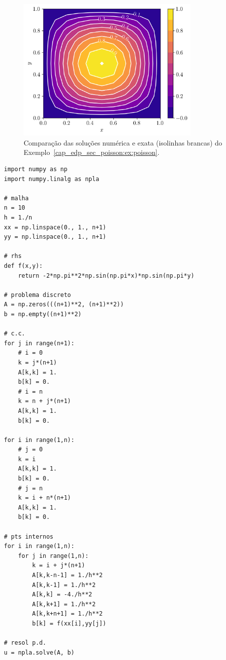 \begin{ex}
\begin{figure}[H]
  \centering
  \includegraphics[width=0.8\textwidth]{./cap_edp/dados/fig_ex_poisson/fig_contour}
  \caption{Comparação das soluções numérica e exata (isolinhas brancas) do Exemplo~\ref{cap_edp_sec_poisson:ex:poisson}.}
  \label{cap_edp_sec_poisson:fig:ex_poisson_b}
\end{figure}

\begin{lstlisting}[caption=mdf\_poisson.py]
import numpy as np
import numpy.linalg as npla

# malha
n = 10
h = 1./n
xx = np.linspace(0., 1., n+1)
yy = np.linspace(0., 1., n+1)

# rhs
def f(x,y):
    return -2*np.pi**2*np.sin(np.pi*x)*np.sin(np.pi*y)

# problema discreto
A = np.zeros(((n+1)**2, (n+1)**2))
b = np.empty((n+1)**2)

# c.c.
for j in range(n+1):
    # i = 0
    k = j*(n+1)
    A[k,k] = 1.
    b[k] = 0.
    # i = n
    k = n + j*(n+1)
    A[k,k] = 1.
    b[k] = 0.

for i in range(1,n):
    # j = 0
    k = i
    A[k,k] = 1.
    b[k] = 0.
    # j = n
    k = i + n*(n+1)
    A[k,k] = 1.
    b[k] = 0.

# pts internos
for i in range(1,n):
    for j in range(1,n):
        k = i + j*(n+1)
        A[k,k-n-1] = 1./h**2
        A[k,k-1] = 1./h**2
        A[k,k] = -4./h**2
        A[k,k+1] = 1./h**2
        A[k,k+n+1] = 1./h**2
        b[k] = f(xx[i],yy[j])

# resol p.d.
u = npla.solve(A, b)
\end{lstlisting}

\end{ex}

